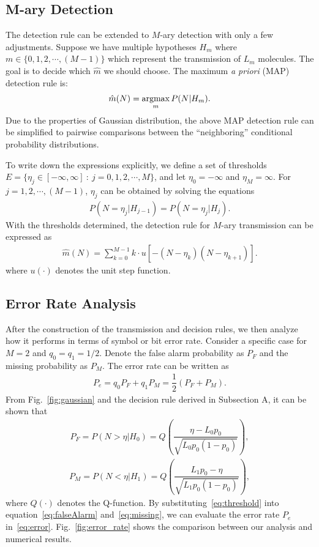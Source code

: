 \subsection{M-ary Detection}
The detection rule can be extended to $M$-ary detection with only a few adjustments.
Suppose we have multiple hypotheses $H_m$ where $m \in \{ 0,1,2,\cdots,(M-1) \}$ which represent the transmission of $L_m$ molecules.
The goal is to decide which $\hat{m}$ we should choose.
The maximum \emph{a priori} (MAP)
detection rule is:
\begin{eqnarray}
\hat{m}(N) = \argmax_{m}P(N | H_m).
\end{eqnarray}
Due to the properties of Gaussian distribution, the above MAP detection rule can be simplified to pairwise comparisons between the ``neighboring'' conditional probability distributions.

To write down the expressions explicitly, we define a set of thresholds
$E = \{\eta_j \in [-\infty,\infty]\ :\ j = 0,1,2,\cdots,M \}$, and let $\eta_0 = -\infty$ and $\eta_M = \infty$.
For $j=1,2,\cdots,(M-1)$, $\eta_j$ can be obtained by solving the equations
\begin{eqnarray}
P(N=\eta_j | H_{j-1}) = P(N=\eta_j | H_j).
\end{eqnarray}
With the thresholds determined, the detection rule for $M$-ary transmission can be
expressed as
\begin{eqnarray}
\hat{m}(N) = \sum^{M-1}_{k=0}k \cdot u\left[-(N-\eta_k)(N-\eta_{k+1})\right].
\end{eqnarray}
where $u(\cdot)$ denotes the unit step function.

\subsection{Error Rate Analysis}
After the construction of the transmission and decision rules, we then analyze how it performs in terms of symbol or bit error rate. Consider a specific case for $M=2$ and $q_0 = q_1 = 1/2$. Denote the false alarm probability as $P_F$ and the missing probability as $P_M$. The error rate can be written as
\begin{eqnarray}
P_e = q_0P_F+q_1P_M=\dfrac{1}{2}(P_F+P_M). \label{eq:error}
\end{eqnarray}
From Fig.~\ref{fig:gaussian} and the decision rule derived in Subsection A, it can be shown that
\begin{eqnarray}
P_F = P(N>\eta | H_0) = Q\left( \dfrac{\eta-L_0p_0}{\sqrt{L_0 p_0 (1 - p_0)}} \right), \label{eq:falseAlarm}
\end{eqnarray}
\begin{eqnarray}
P_M = P(N < \eta | H_1) = Q\left( \dfrac{L_1p_0 - \eta}{\sqrt{ L_1 p_0 (1 - p_0)}} \right), \label{eq:missing}
\end{eqnarray}
where $Q(\cdot)$ denotes the Q-function.
By substituting~\eqref{eq:threshold} into equation~\eqref{eq:falseAlarm} and~\eqref{eq:missing}, we can evaluate the
error rate $P_e$ in~\eqref{eq:error}. Fig.~\ref{fig:error_rate} shows the comparison between our analysis and numerical results.

